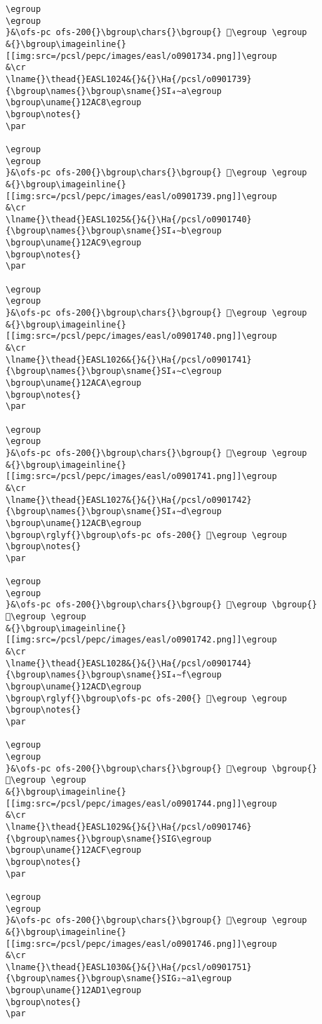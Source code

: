 \begin{verbatim}
\egroup
\egroup
}&\ofs-pc ofs-200{}\bgroup\chars{}\bgroup{} 𒫆\egroup \egroup
&{}\bgroup\imageinline{}[[img:src=/pcsl/pepc/images/easl/o0901734.png]]\egroup
&\cr
\lname{}\thead{}EASL1024&{}&{}\Ha{/pcsl/o0901739}{\bgroup\names{}\bgroup\sname{}SI₄∼a\egroup
\bgroup\uname{}12AC8\egroup
\bgroup\notes{}
\par 

\egroup
\egroup
}&\ofs-pc ofs-200{}\bgroup\chars{}\bgroup{} 𒫈\egroup \egroup
&{}\bgroup\imageinline{}[[img:src=/pcsl/pepc/images/easl/o0901739.png]]\egroup
&\cr
\lname{}\thead{}EASL1025&{}&{}\Ha{/pcsl/o0901740}{\bgroup\names{}\bgroup\sname{}SI₄∼b\egroup
\bgroup\uname{}12AC9\egroup
\bgroup\notes{}
\par 

\egroup
\egroup
}&\ofs-pc ofs-200{}\bgroup\chars{}\bgroup{} 𒫉\egroup \egroup
&{}\bgroup\imageinline{}[[img:src=/pcsl/pepc/images/easl/o0901740.png]]\egroup
&\cr
\lname{}\thead{}EASL1026&{}&{}\Ha{/pcsl/o0901741}{\bgroup\names{}\bgroup\sname{}SI₄∼c\egroup
\bgroup\uname{}12ACA\egroup
\bgroup\notes{}
\par 

\egroup
\egroup
}&\ofs-pc ofs-200{}\bgroup\chars{}\bgroup{} 𒫊\egroup \egroup
&{}\bgroup\imageinline{}[[img:src=/pcsl/pepc/images/easl/o0901741.png]]\egroup
&\cr
\lname{}\thead{}EASL1027&{}&{}\Ha{/pcsl/o0901742}{\bgroup\names{}\bgroup\sname{}SI₄∼d\egroup
\bgroup\uname{}12ACB\egroup
\bgroup\rglyf{}\bgroup\ofs-pc ofs-200{} 𒫋\egroup \egroup
\bgroup\notes{}
\par 

\egroup
\egroup
}&\ofs-pc ofs-200{}\bgroup\chars{}\bgroup{} 𒫋\egroup \bgroup{} 𒫌\egroup \egroup
&{}\bgroup\imageinline{}[[img:src=/pcsl/pepc/images/easl/o0901742.png]]\egroup
&\cr
\lname{}\thead{}EASL1028&{}&{}\Ha{/pcsl/o0901744}{\bgroup\names{}\bgroup\sname{}SI₄∼f\egroup
\bgroup\uname{}12ACD\egroup
\bgroup\rglyf{}\bgroup\ofs-pc ofs-200{} 𒫍\egroup \egroup
\bgroup\notes{}
\par 

\egroup
\egroup
}&\ofs-pc ofs-200{}\bgroup\chars{}\bgroup{} 𒫍\egroup \bgroup{} 𒫎\egroup \egroup
&{}\bgroup\imageinline{}[[img:src=/pcsl/pepc/images/easl/o0901744.png]]\egroup
&\cr
\lname{}\thead{}EASL1029&{}&{}\Ha{/pcsl/o0901746}{\bgroup\names{}\bgroup\sname{}SIG\egroup
\bgroup\uname{}12ACF\egroup
\bgroup\notes{}
\par 

\egroup
\egroup
}&\ofs-pc ofs-200{}\bgroup\chars{}\bgroup{} 𒫏\egroup \egroup
&{}\bgroup\imageinline{}[[img:src=/pcsl/pepc/images/easl/o0901746.png]]\egroup
&\cr
\lname{}\thead{}EASL1030&{}&{}\Ha{/pcsl/o0901751}{\bgroup\names{}\bgroup\sname{}SIG₂∼a1\egroup
\bgroup\uname{}12AD1\egroup
\bgroup\notes{}
\par 


\end{verbatim}
